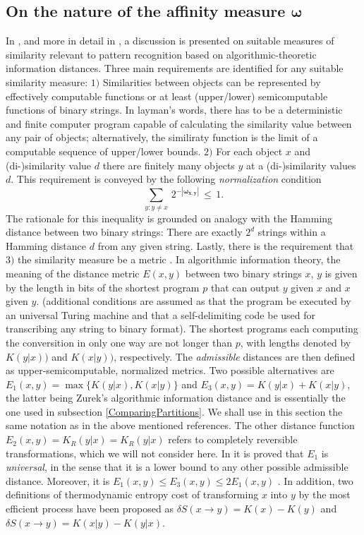 \documentclass[twocolumn,aps,sort,nofootinbib]{revtex4}
\begin{document}
\subsection{On the nature of the affinity measure $\boldsymbol{\omega}$}\label{NatureAffinityMeasure}
In \cite{Zurek89-1,Zurek89-2}, and more in detail in \cite{Bennet98-1}, 
a discussion is presented on suitable measures
of similarity relevant to pattern recognition based
on algorithmic-theoretic information distances. 
Three main requirements are identified \cite{Bennet98-1} for
any suitable similarity measure:
$1)$ Similarities between objects
can be represented by effectively computable functions or at least
(upper/lower) semicomputable functions of binary strings. In layman's
words, there has to be a deterministic and finite computer program
capable of calculating the similarity value between any pair of objects;
alternatively, the similiraty function is the limit of a computable sequence 
of upper/lower bounds.
$2)$ For each object $x$ and (di-)similarity value $d$ there are
finitely many objects $y$ at a (di-)similarity values $d$. 
This requirement is conveyed by the following {\sl normalization} condition
\begin{equation}
\sum_{y:y\neq x}\,2^{-|\boldsymbol{\omega_{x,y}}|}\,\leq\,1.
\label{AffinityNormalizationCondition}
\end{equation}
The rationale for this inequality is grounded on
analogy with the Hamming distance between two binary strings:
There are exactly $2^d$ strings within a Hamming distance $d$ from
any given string. 
Lastly, there is the requirement that 
$3)$ the similarity measure be a metric \cite{Bennet98-1}.
In algorithmic information theory, 
the meaning of the distance metric $E(x,y)$ 
between two binary strings $x,\,y$ is
given by the length in bits of the shortest program $p$ that
can output $y$ given $x$ and $x$ given $y$. 
(additional conditions are assumed as that the program be executed by an universal
Turing machine and that a self-delimiting code be used for transcribing 
any string to binary format). The shortest programs each
computing the conversition in only one way are not longer than $p$,
with lengths denoted by
$K(y|x))$ and $K(x|y))$, respectively.
The {\sl admissible} distances are then defined as 
upper-semicomputable, normalized metrics. 
Two possible alternatives are
$E_1(x,y)=\max\{K(y|x),K(x|y)\}$ and $E_3(x,y)=K(y|x)+K(x|y)$, the
latter being Zurek's algorithmic information distance and is essentially
the one used in subsection \ref{ComparingPartitions}. We shall use in this
section the same notation as in the above mentioned references.
The other distance function $E_2(x,y)=K_R(y|x)=K_R(y|x)$ refers to
completely reversible transformations, which we will not consider here. 
In \cite{Bennet98-1} it is proved that $E_1$ is
{\sl universal}, in the sense that it is a lower bound
to any other possible admissible distance. Moreover,
it is $E_1(x,y)\leq E_3(x,y)\leq 2E_1(x,y)$ \cite{Bennet98-1}.
In addition, two definitions of thermodynamic entropy cost
of transforming $x$ into $y$ by the most efficient process have
been proposed \cite{Zurek89-1,Bennet98-1}
as $\delta S(x\rightarrow y)=K(x)-K(y)$ 
and $\delta S(x\rightarrow y)=K(x|y)-K(y|x)$. 
\end{document}
